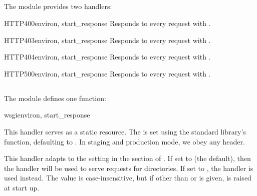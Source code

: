 \subsection{}
\label{api-handlers-http}

The  module provides two handlers:

\begin{funcdesc}{HTTP400}{environ, start_response}
Responds to every request with .
\end{funcdesc}

\begin{funcdesc}{HTTP403}{environ, start_response}
Responds to every request with .
\end{funcdesc}

\begin{funcdesc}{HTTP404}{environ, start_response}
Responds to every request with .
\end{funcdesc}

\begin{funcdesc}{HTTP500}{environ, start_response}
Responds to every request with .
\end{funcdesc}


\subsection{}
\label{api-handlers-static}

The  module defines one function:

\begin{funcdesc}{wsgi}{environ, start_response}

This handler serves  as a static resource. The
 is set using the standard library's
 function, defaulting to . In
staging and production mode, we obey any  header.

This handler adapts to the  setting in the \code{[static]}
section of . If set to  (the default), then the
 handler will be used to serve requests for
directories. If set to , the  handler
is used instead. The  value is case-insensitive, but if other
than  or  is given,  is raised at start
up.

\end{funcdesc}

